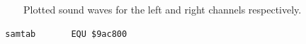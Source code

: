 \begin{figure}[H]
    \centering
    \begin{adjustbox}{width=12cm,center}
      \hspace{0.5cm}
    \end{adjustbox}
  \caption{Plotted sound waves for the left and right channels respectively.}
\end{figure}


\begin{lstlisting}
  samtab       EQU $9ac800
\end{lstlisting}

